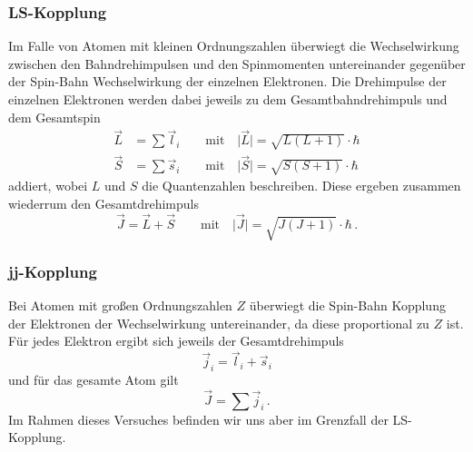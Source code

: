             \subsubsection{LS-Kopplung}
                Im Falle von Atomen mit kleinen Ordnungszahlen überwiegt die Wechselwirkung zwischen
                den Bahndrehimpulsen und den Spinmomenten untereinander gegenüber der Spin-Bahn Wechselwirkung der einzelnen Elektronen.
                Die Drehimpulse der einzelnen Elektronen werden dabei jeweils zu dem Gesamtbahndrehimpuls und dem Gesamtspin
                \begin{align}
                    \vec{L}&=\sum\vec{l}_i \qquad\text{mit}\quad \vert\vec{L}\vert=\sqrt{L(L+1)}\cdot\hbar \\
                    \vec{S}&=\sum\vec{s}_i \qquad\text{mit}\quad \vert\vec{S}\vert=\sqrt{S(S+1)}\cdot\hbar
                \end{align}
                addiert, wobei $L$ und $S$ die Quantenzahlen beschreiben.
                Diese ergeben zusammen wiederrum den Gesamtdrehimpuls
                \begin{equation}
                    \vec{J}=\vec{L}+\vec{S} \qquad\text{mit}\quad \vert\vec{J}\vert=\sqrt{J(J+1)}\cdot\hbar \, .
                \end{equation}
            \subsubsection{jj-Kopplung}
                Bei Atomen mit großen Ordnungszahlen $Z$ überwiegt die Spin-Bahn Kopplung der Elektronen der Wechselwirkung untereinander,
                da diese proportional zu $Z$ ist.
                Für jedes Elektron ergibt sich jeweils der Gesamtdrehimpuls
                \begin{equation}
                    \vec{j}_i=\vec{l}_i+\vec{s}_i 
                \end{equation}
                und für das gesamte Atom gilt
                \begin{equation}
                    \vec{J}=\sum\vec{j}_i \, .
                \end{equation}
            Im Rahmen dieses Versuches befinden wir uns aber im Grenzfall der LS-Kopplung.
